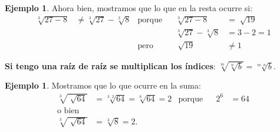 \documentclass[12pt]{examdesign}
\theoremstyle{plain}
\theoremstyle{definition}
\newtheorem{exa}[theorem]{Ejemplo}
\theoremstyle{remark}
\begin{document}
\begin{endmatter}
	    \begin{exa}Ahora bien, mostramos que lo que en la resta ocurre si:
	    	\begin{align*}
	    	\sqrt[3]{27 - 8}&\not= \sqrt[3]{27}-\sqrt[3]{8}&         \mbox{porque}&&                \sqrt[3]{27 - 8}&=\sqrt[]{19} \\
	    	                &                              &                      &&        \sqrt[3]{27}-\sqrt[3]{8}&= 3 - 2 = 1  \\
	    	                &                              &           \mbox{pero}&&                     \sqrt[]{19}&\not= 1
	    	\end{align*}
	    \end{exa}
        \textbf{Si tengo una raíz de raíz se multiplican los índices}: $\sqrt[m]{\sqrt[n]{b}}=\sqrt[m\cdot n]{b}$.
        \begin{exa} Mostramos que lo que ocurre en la suma:
        	\begin{align*}
        	    \sqrt[3]{\sqrt[]{64}}&=\sqrt[3\cdot 2]{64}=\sqrt[6]{64}=2&             \mbox{porque} &&                  2^{6}&=64 \\
        	           \mbox{o bien} &                                   &                           &&                       &    \\
        	    \sqrt[3]{\sqrt[]{64}}&=\sqrt[3]{8}=2.                   &                           &&                       &                     
        	\end{align*}
        \end{exa}
	\end{endmatter}
\end{document}
